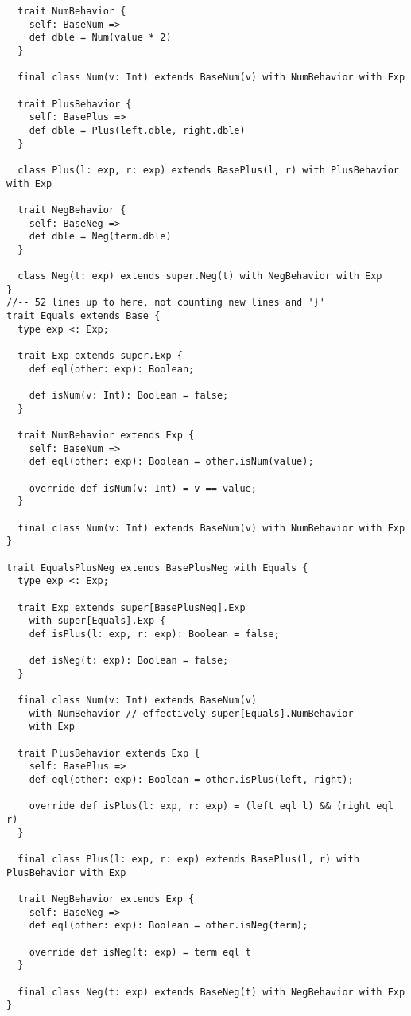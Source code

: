 \begin{lstlisting}
  trait NumBehavior {
    self: BaseNum =>
    def dble = Num(value * 2)
  }

  final class Num(v: Int) extends BaseNum(v) with NumBehavior with Exp

  trait PlusBehavior {
    self: BasePlus =>
    def dble = Plus(left.dble, right.dble)
  }

  class Plus(l: exp, r: exp) extends BasePlus(l, r) with PlusBehavior with Exp

  trait NegBehavior {
    self: BaseNeg =>
    def dble = Neg(term.dble)
  }

  class Neg(t: exp) extends super.Neg(t) with NegBehavior with Exp
}
//-- 52 lines up to here, not counting new lines and '}'
trait Equals extends Base {
  type exp <: Exp;

  trait Exp extends super.Exp {
    def eql(other: exp): Boolean;

    def isNum(v: Int): Boolean = false;
  }

  trait NumBehavior extends Exp {
    self: BaseNum =>
    def eql(other: exp): Boolean = other.isNum(value);

    override def isNum(v: Int) = v == value;
  }

  final class Num(v: Int) extends BaseNum(v) with NumBehavior with Exp
}

trait EqualsPlusNeg extends BasePlusNeg with Equals {
  type exp <: Exp;

  trait Exp extends super[BasePlusNeg].Exp
    with super[Equals].Exp {
    def isPlus(l: exp, r: exp): Boolean = false;

    def isNeg(t: exp): Boolean = false;
  }

  final class Num(v: Int) extends BaseNum(v)
    with NumBehavior // effectively super[Equals].NumBehavior
    with Exp

  trait PlusBehavior extends Exp {
    self: BasePlus =>
    def eql(other: exp): Boolean = other.isPlus(left, right);

    override def isPlus(l: exp, r: exp) = (left eql l) && (right eql r)
  }

  final class Plus(l: exp, r: exp) extends BasePlus(l, r) with PlusBehavior with Exp

  trait NegBehavior extends Exp {
    self: BaseNeg =>
    def eql(other: exp): Boolean = other.isNeg(term);

    override def isNeg(t: exp) = term eql t
  }

  final class Neg(t: exp) extends BaseNeg(t) with NegBehavior with Exp
}


\end{lstlisting}
